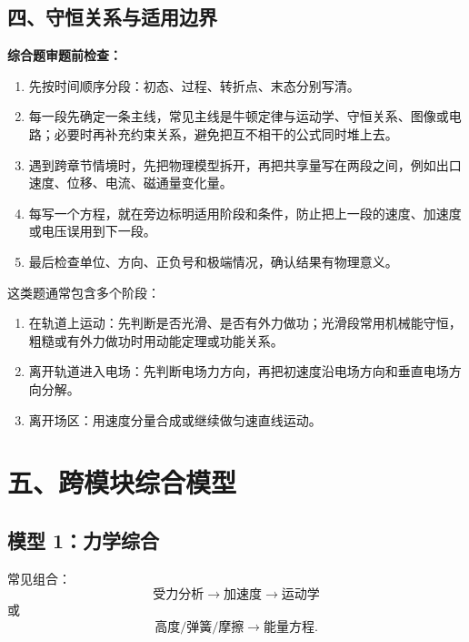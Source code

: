 \begin{samepage}
\section*{四、守恒关系与适用边界}

\textbf{综合题审题前检查：}
\nopagebreak[4]
\begin{enumerate}
  \item 先按时间顺序分段：初态、过程、转折点、末态分别写清。
  \item 每一段先确定一条主线，常见主线是牛顿定律与运动学、守恒关系、图像或电路；必要时再补充约束关系，避免把互不相干的公式同时堆上去。
  \item 遇到跨章节情境时，先把物理模型拆开，再把共享量写在两段之间，例如出口速度、位移、电流、磁通量变化量。
  \item 每写一个方程，就在旁边标明适用阶段和条件，防止把上一段的速度、加速度或电压误用到下一段。
  \item 最后检查单位、方向、正负号和极端情况，确认结果有物理意义。
\end{enumerate}
\end{samepage}

\begin{center}


\label{fig:integrated-track-field}
\end{center}

这类题通常包含多个阶段：
\begin{enumerate}
  \item 在轨道上运动：先判断是否光滑、是否有外力做功；光滑段常用机械能守恒，粗糙或有外力做功时用动能定理或功能关系。
  \item 离开轨道进入电场：先判断电场力方向，再把初速度沿电场方向和垂直电场方向分解。
  \item 离开场区：用速度分量合成或继续做匀速直线运动。
\end{enumerate}

\section*{五、跨模块综合模型}

\subsection*{模型 1：力学综合}

常见组合：
\[
\text{受力分析}\rightarrow\text{加速度}\rightarrow\text{运动学}
\]
或
\[
\text{高度/弹簧/摩擦}\rightarrow\text{能量方程}.
\]


